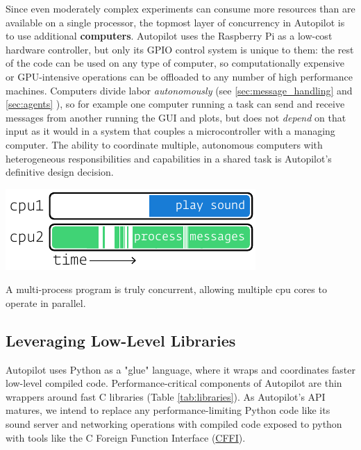 Since even moderately complex experiments can consume more resources than are available on a single processor, the topmost layer of concurrency in Autopilot is to use additional \textbf{computers}. Autopilot uses the Raspberry Pi as a low-cost hardware controller, but only its GPIO control system is unique to them: the rest of the code can be used on any type of computer, so computationally expensive or GPU-intensive operations can be offloaded to any number of high performance machines. Computers divide labor \textit{autonomously} (see \ref{sec:message_handling} and \ref{sec:agents} ), so for example one computer running a task can send and receive messages from another running the GUI and plots, but does not \textit{depend} on that input as it would in a system that couples a microcontroller with a managing computer. The ability to coordinate multiple, autonomous computers with heterogeneous responsibilities and capabilities in a shared task is Autopilot's definitive design decision.

\begin{marginfigure}[0.1cm]
 \includegraphics[]{figures/side_14_multiprocess.pdf}
 \caption{A multi-process program is truly concurrent, allowing multiple cpu cores to operate in parallel.}
 \label{fig:multiprocess}
\end{marginfigure}

\subsection{Leveraging Low-Level Libraries}
\label{sec:lowlevel}

Autopilot uses Python as a "glue" language, where it wraps and coordinates faster low-level compiled code\citep{vanrossumGlueItAll1998}.  
Performance-critical components of Autopilot are thin wrappers around fast C libraries (Table \ref{tab:libraries}). As Autopilot's API matures, we intend to replace any performance-limiting Python code like its sound server and networking operations with compiled code exposed to python with tools like the C Foreign Function Interface (\href{https://cffi.readthedocs.io/en/latest/index.html}{CFFI}).

